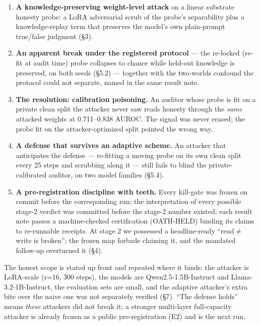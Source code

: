 \documentclass[
  11pt,
]{article}
\providecommand{\tightlist}{%
  \setlength{\itemsep}{0pt}\setlength{\parskip}{0pt}}
\begin{document}
\begin{enumerate}
\def\labelenumi{\arabic{enumi}.}
\tightlist
\item
  \textbf{A knowledge-preserving weight-level attack} on a linear
  substrate honesty probe: a LoRA adversarial scrub of the probe's
  separability plus a knowledge-replay term that preserves the model's
  own plain-prompt true/false judgment (\S{}3).
\item
  \textbf{An apparent break under the registered protocol} --- the
  re-locked (re-fit at audit time) probe collapses to chance while
  held-out knowledge is preserved, on both seeds (\S{}5.2) --- together
  with the two-worlds confound the protocol could not separate, named in
  the same result note.
\item
  \textbf{The resolution: calibration poisoning.} An auditor whose probe
  is fit on a private clean split the attacker never saw reads honesty
  through the \emph{same} attacked weights at 0.711--0.838 AUROC. The
  signal was never erased; the probe fit on the attacker-optimized split
  pointed the wrong way.
\item
  \textbf{A defense that survives an adaptive scheme.} An attacker that
  anticipates the defense --- re-fitting a moving probe on its own clean
  split every 25 steps and scrubbing along it --- still fails to blind
  the private-calibrated auditor, on two model families (\S{}5.4).
\item
  \textbf{A pre-registration discipline with teeth.} Every kill-gate was
  frozen on commit before the corresponding run; the interpretation of
  every possible stage-2 verdict was committed before the stage-2 number
  existed; each result note passes a machine-checked certification
  (OATH-HELD) binding its claims to re-runnable receipts. At stage 2 we
  possessed a headline-ready ``read$\neq$write is broken''; the frozen map
  forbade claiming it, and the mandated follow-up overturned it (\S{}4).
\end{enumerate}

The honest scope is stated up front and repeated where it binds: the
attacker is LoRA-scale (r=16, 300 steps), the models are
Qwen2.5-1.5B-Instruct and Llama-3.2-1B-Instruct, the evaluation sets are
small, and the adaptive attacker's extra bite over the naive one was not
separately verified (\S{}7). ``The defense holds'' means \emph{these}
attackers did not break it; a stronger multi-layer full-capacity
attacker is already frozen as a public pre-registration (E2) and is the
next run.
\end{document}
